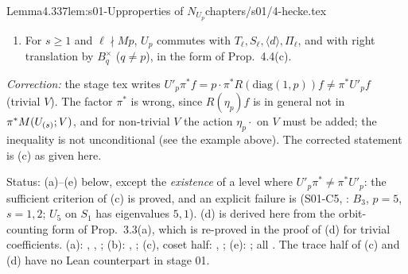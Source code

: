 \begin{quoted}{Lemma}{4.3}{37}{lem:s01-Up}{properties of $N_{U_p}$}{chapters/s01/4-hecke.tex}
\begin{enumerate}[label=(\alph*)]
  $d\equiv1\bmod p^s$ (the diamond at the primes dividing $M$); so under $\nu$ the homological $U_p$ on $\Zp[S_s]$ becomes
  $\langle p\rangle_MU'_p$ on $\Zp^{S_s}$: $\nu\circ U_p=\langle p\rangle_MU'_p\circ\nu$ (consistent with (b), (c) and
  Prop.~3.3(c)).
\item For $s\ge1$ and $\ell\nmid Mp$, $U_p$ commutes with $T_\ell,S_\ell,\langle d\rangle,\Pi_\ell$, and with right translation by
  $B_q^\times$ ($q\ne p$), in the form of Prop.~4.4(c).
\end{enumerate}
\emph{Correction:} the stage tex writes $U'_p\pi^*f=p\cdot\pi^*R(\mathrm{diag}(1,p))f\ne\pi^*U'_pf$ (trivial $V$). The factor
$\pi^*$ is wrong, since $R(\eta_p)f$ is in general not in $\pi^*M(U_{(s)};V)$, and for non-trivial $V$ the action $\eta_p\cdot$ on $V$ must be added;
the inequality is not unconditional (see the example above). The corrected statement is (c) as given here.

Status: (a)--(e) \stproved{} below, except the \emph{existence} of a level where $U'_p\pi^*\ne\pi^*U'_p$: the sufficient
criterion of (c) is proved, and an explicit failure is \stcomp{} (S01-C5, : $B_3$, $p=5$, $s=1,2$; $U_5$ on $S_1$ has eigenvalues $5,1$). (d) is derived here from the orbit-counting form of Prop.~3.3(a), which
is re-proved in the proof of (d) for trivial coefficients.
(a): , ,
; (b): , ;
(c), coset half: , ; (e):
; all \stformal{}. The trace half of (c) and (d) have no Lean counterpart in stage 01.
\end{quoted}
